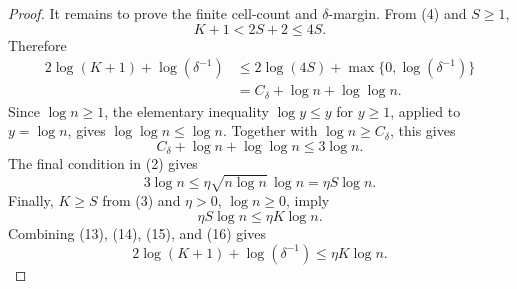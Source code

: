 \begin{proof}
It remains to prove the finite cell-count and \(\delta\)-margin.  From (4) and
\(S\ge1\),
\[
K+1<2S+2\le4S. \tag{12}
\]
Therefore
\[
\begin{aligned}
2\log(K+1)+\log(\delta^{-1})
&\le 2\log(4S)+\max\{0,\log(\delta^{-1})\}\\
&=C_\delta+\log n+\log\log n.
\end{aligned} \tag{13}
\]
Since \(\log n\ge1\), the elementary inequality \(\log y\le y\) for
\(y\ge1\), applied to \(y=\log n\), gives \(\log\log n\le\log n\).  Together
with \(\log n\ge C_\delta\), this gives
\[
C_\delta+\log n+\log\log n\le 3\log n. \tag{14}
\]
The final condition in (2) gives
\[
3\log n\le \eta\sqrt{n\log n}\,\log n
=\eta S\log n. \tag{15}
\]
Finally, \(K\ge S\) from (3) and \(\eta>0\), \(\log n\ge0\), imply
\[
\eta S\log n\le \eta K\log n. \tag{16}
\]
Combining (13), (14), (15), and (16) gives
\[
2\log(K+1)+\log(\delta^{-1})\le \eta K\log n.
\]
\end{proof}
